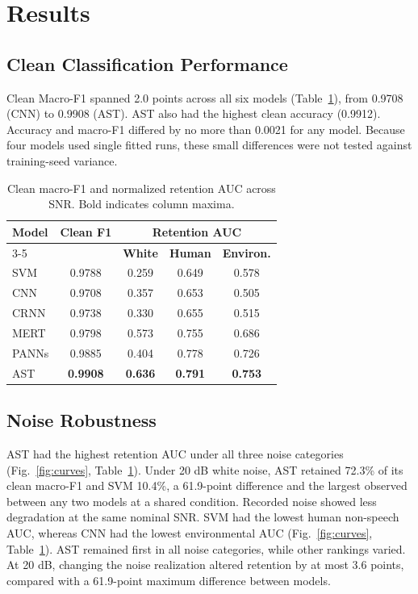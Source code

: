 \documentclass[conference]{IEEEtran}
\begin{document}
\section{Results}

\subsection{Clean Classification Performance}
Clean Macro-F1 spanned 2.0 points across all six models (Table~\ref{tab:auc}), from 0.9708 (CNN)
to 0.9908 (AST). AST also had the highest clean accuracy (0.9912). Accuracy and macro-F1 differed by no more than 0.0021 for any model. Because four models used single fitted runs, these small differences were not tested against training-seed variance.

\begin{table}[H]
\caption{Clean macro-F1 and normalized retention AUC across SNR.
Bold indicates column maxima.}
\label{tab:auc}
\centering
\footnotesize
\begin{tabular}{lcccc}
\hline
\textbf{Model} &
\textbf{Clean F1} &
\multicolumn{3}{c}{\textbf{Retention AUC}} \\
\cline{3-5}
& & \textbf{White} & \textbf{Human} & \textbf{Environ.} \\
\hline
SVM   & 0.9788 & 0.259 & 0.649 & 0.578 \\
CNN   & 0.9708 & 0.357 & 0.653 & 0.505 \\
CRNN  & 0.9738 & 0.330 & 0.655 & 0.515 \\
MERT  & 0.9798 & 0.573 & 0.755 & 0.686 \\
PANNs & 0.9885 & 0.404 & 0.778 & 0.726 \\
AST   & \textbf{0.9908} & \textbf{0.636} &
        \textbf{0.791} & \textbf{0.753} \\
\hline
\end{tabular}
\end{table}

\subsection{Noise Robustness}
AST had the highest retention AUC under all three noise categories (Fig.~\ref{fig:curves}, Table~\ref{tab:auc}). Under 20 dB white noise, AST retained 72.3\% of its clean macro-F1 and SVM 10.4\%, a 61.9-point difference and the largest observed between any two models at a shared condition. Recorded noise showed less degradation at the same nominal SNR. SVM had the lowest human non-speech AUC, whereas CNN had the lowest environmental AUC (Fig.~\ref{fig:curves}, Table~\ref{tab:auc}). AST remained first in all noise categories, while other rankings varied. At 20 dB, changing the noise realization altered retention by at most 3.6 points, compared with a 61.9-point maximum difference between models.
\end{document}
